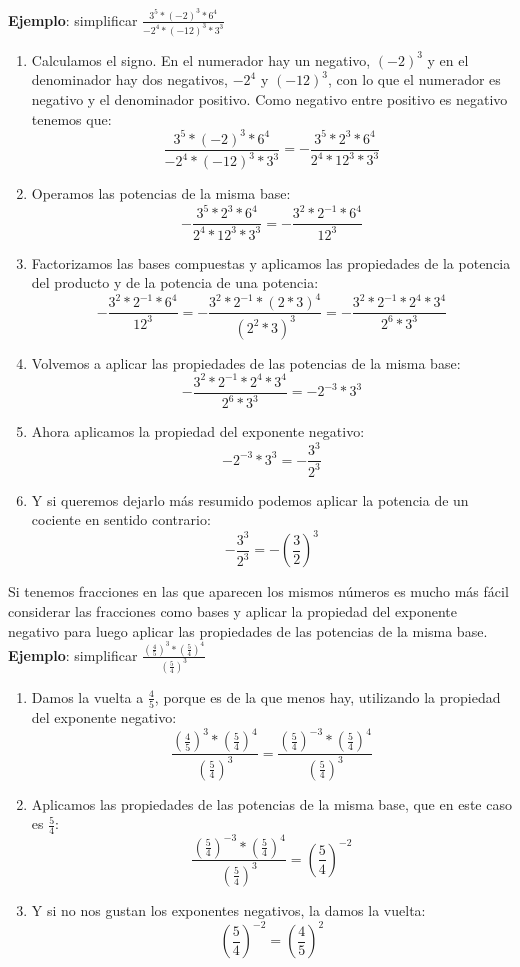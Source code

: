 \documentclass[a4paper,11pt,answers]{exam}
\newcommand\ddfrac[2]{\frac{\displaystyle #1}{\displaystyle #2}}
\begin{document}
\textbf{Ejemplo}: simplificar $\frac{3^5 * (-2)^3 *6^4}{-2^4 * (-12)^3 *3^3}$
\begin{enumerate}
	\item Calculamos el signo. En el numerador hay un negativo, $(-2)^3$ y en el denominador hay dos negativos, $-2^4$ y $(-12)^3$, con lo que el numerador es negativo y el denominador positivo. Como negativo entre positivo es negativo tenemos que:
	\[\frac{3^5 * (-2)^3 *6^4}{-2^4 * (-12)^3 *3^3} = - \frac{3^5 * 2^3 *6^4}{2^4 * 12^3 *3^3}\]
	\item Operamos las potencias de la misma base:
	\[- \frac{3^5 * 2^3 *6^4}{2^4 * 12^3 *3^3} = - \frac{3^2 * 2^{-1} * 6^4}{12^3}\]
	\item Factorizamos las bases compuestas y aplicamos las propiedades de la potencia del producto y de la potencia de una potencia:
	\[- \frac{3^2 * 2^{-1} * 6^4}{12^3} = - \frac{3^2 * 2^{-1} * (2*3)^4}{\left(2^2 * 3 \right)^3} =- \frac{3^2 * 2^{-1} * 2^4 * 3^4}{2^6 * 3^3}\]
	\item Volvemos a aplicar las propiedades de las potencias de la misma base:  
	\[- \frac{3^2 * 2^{-1} * 2^4 * 3^4}{2^6 * 3^3} = - 2^{-3} * 3^3\]
	\item Ahora aplicamos la propiedad del exponente negativo:
	\[- 2^{-3} * 3^3 = -\frac{3^3}{2^3}\]
	\item Y si queremos dejarlo más resumido podemos aplicar la potencia de un cociente en sentido contrario:
	\[-\frac{3^3}{2^3} = -\left(\frac{3}{2} \right)^3\]
\end{enumerate}

Si tenemos fracciones en las que aparecen los mismos números es mucho más fácil considerar las fracciones como bases y aplicar la propiedad del exponente negativo para luego aplicar las propiedades de las potencias de la misma base.\\

\textbf{Ejemplo}: simplificar $\ddfrac{\left(\frac{4}{5} \right)^3 * \left( \frac{5}{4} \right)^4}{\left(\frac{5}{4} \right)^3}$
\begin{enumerate}
	\item Damos la vuelta a $\frac{4}{5}$, porque es de la que menos hay, utilizando la propiedad del exponente negativo:
	\[\ddfrac{\left(\frac{4}{5} \right)^3 * \left( \frac{5}{4} \right)^4}{\left(\frac{5}{4} \right)^3} = \ddfrac{\left(\frac{5}{4} \right)^{-3} * \left( \frac{5}{4} \right)^4}{\left(\frac{5}{4} \right)^3}\]
	\item Aplicamos las propiedades de las potencias de la misma base, que en este caso es $\frac{5}{4}$:
	\[\ddfrac{\left(\frac{5}{4} \right)^{-3} * \left( \frac{5}{4} \right)^4}{\left(\frac{5}{4} \right)^3} = \left( \frac{5}{4} \right)^{-2}\]
	\item Y si no nos gustan los exponentes negativos, la damos la vuelta:
	\[\left( \frac{5}{4} \right)^{-2} = \left( \frac{4}{5} \right)^2\]
\end{enumerate}
\end{document}
